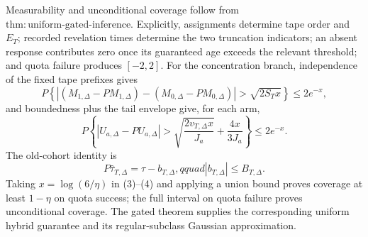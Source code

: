 Measurability and unconditional coverage follow from \(\mathrm{thm:uniform\text{-}gated\text{-}inference}\).  Explicitly, assignments determine tape order and \(E_T\); recorded revelation times determine the two truncation indicators; an absent response contributes zero once its guaranteed age exceeds the relevant threshold; and quota failure produces \([-2,2]\).  For the concentration branch, independence of the fixed tape prefixes gives
\[
 P\left\{\left|(M_{1,\Delta}-PM_{1,\Delta})
 -(M_{0,\Delta}-PM_{0,\Delta})\right|>\sqrt{2S_Tx}\right\}
 \leq2e^{-x}, \tag{3}
\]
and boundedness plus the tail envelope give, for each arm,
\[
 P\left\{|U_{a,\Delta}-PU_{a,\Delta}|>
 \sqrt{\frac{2v_{T,\Delta}x}{J_a}}+\frac{4x}{3J_a}\right\}
 \leq2e^{-x}. \tag{4}
\]
The old-cohort identity is
\[
 P\widehat\tau_{T,\Delta}=\tau-b_{T,\Delta},qquad
 |b_{T,\Delta}|\leq B_{T,\Delta}. \tag{5}
\]
Taking \(x=\log(6/\eta)\) in (3)--(4) and applying a union bound proves coverage at least \(1-\eta\) on quota success; the full interval on quota failure proves unconditional coverage.  The gated theorem supplies the corresponding uniform hybrid guarantee and its regular-subclass Gaussian approximation.

